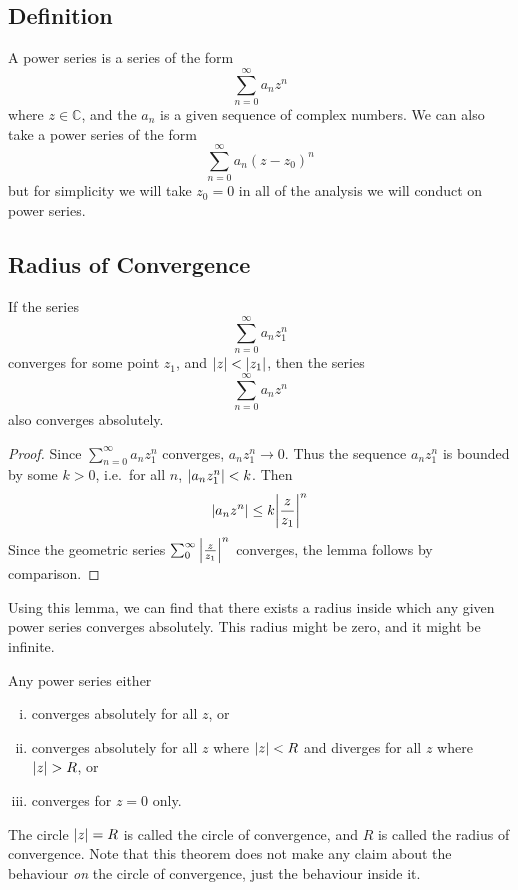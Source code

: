 \subsection{Definition}
A power series is a series of the form
\[
	\sum_{n=0}^\infty a_n z^n
\]
where \(z \in \mathbb C\), and the \(a_n\) is a given sequence of complex numbers.
We can also take a power series of the form
\[
	\sum_{n=0}^\infty a_n (z-z_0)^n
\]
but for simplicity we will take \(z_0 = 0\) in all of the analysis we will conduct on power series.

\subsection{Radius of Convergence}
\begin{lemma}
	If the series
	\[
		\sum_{n=0}^\infty a_n z_1^n
	\]
	converges for some point \(z_1\), and \(\abs{z} < \abs{z_1}\), then the series
	\[
		\sum_{n=0}^\infty a_n z^n
	\]
	also converges absolutely.
\end{lemma}
\begin{proof}
	Since \(\sum_{n=0}^\infty a_n z_1^n\) converges, \(a_n z_1^n \to 0\).
	Thus the sequence \(a_n z_1^n\) is bounded by some \(k > 0\), i.e.\ for all \(n\), \(\abs{a_n z_1^n}<k\).
	Then
	\[
		\abs{a_n z^n} \leq k\abs{\frac{z}{z_1}}^n
	\]
	Since the geometric series \(\sum_0^\infty \abs{\frac{z}{z_1}}^n\) converges, the lemma follows by comparison.
\end{proof}
\noindent Using this lemma, we can find that there exists a radius inside which any given power series converges absolutely.
This radius might be zero, and it might be infinite.
\begin{theorem}
	Any power series either
	\begin{enumerate}[(i)]
		\item converges absolutely for all \(z\), or
		\item converges absolutely for all \(z\) where \(\abs{z} < R\) and diverges for all \(z\) where \(\abs{z} > R\), or
		\item converges for \(z = 0\) only.
	\end{enumerate}
\end{theorem}
\noindent The circle \(\abs{z} = R\) is called the circle of convergence, and \(R\) is called the radius of convergence.
Note that this theorem does not make any claim about the behaviour \textit{on} the circle of convergence, just the behaviour inside it.
